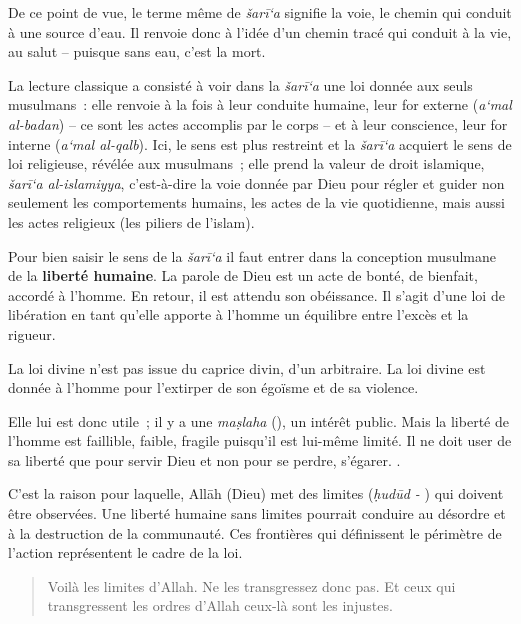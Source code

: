 De ce point de vue, le terme même de \emph{šarī`a} signifie la voie, le
chemin qui conduit à une source d'eau. Il renvoie donc à l'idée d'un
chemin tracé qui conduit à la vie, au salut -- puisque sans eau, c'est
la mort.

La lecture classique a consisté à voir dans la \emph{šarī`a} une loi
donnée aux seuls musulmans~: elle renvoie à la fois à leur conduite
humaine, leur for externe (\emph{a`mal al-badan}) -- ce sont les actes
accomplis par le corps -- et à leur conscience, leur for interne
(\emph{a`mal al-qalb}). Ici, le sens est plus restreint et la
\emph{šarī`a} acquiert le sens de loi religieuse, révélée aux
musulmans~; elle prend la valeur de droit islamique, \emph{šarī`a
al-islamiyya}, c'est-à-dire la voie donnée par Dieu pour régler et
guider non seulement les comportements humains, les actes de la vie
quotidienne, mais aussi les actes religieux (les piliers de l'islam).

Pour bien saisir le sens de la \emph{šarī`a} il faut entrer dans la
conception musulmane de la \textbf{liberté humaine}. La parole de Dieu est un
acte de bonté, de bienfait, accordé à l'homme. En retour, il est attendu
son obéissance. Il s'agit d'une loi de libération en tant qu'elle
apporte à l'homme un équilibre entre l'excès et la rigueur. 
\begin{Def}[Loi]
La loi
divine n'est pas issue du caprice divin, d'un arbitraire. La loi divine
est donnée à l'homme pour l'extirper de son égoïsme et de sa violence.
\end{Def}


Elle lui est donc utile~; il y a une \emph{maṣlaha} (), un
intérêt public. 
Mais la liberté de l'homme est faillible, faible,
fragile puisqu'il est lui-même limité. Il ne doit user de sa liberté que
pour servir Dieu et non pour se perdre, s'égarer.
.

C'est la raison pour laquelle, Allāh (Dieu) met des limites (\emph{ḥudūd
-} ) qui doivent être observées. Une liberté humaine sans
limites pourrait conduire au désordre et à la destruction de la
communauté. Ces frontières qui définissent le périmètre de l'action
représentent le cadre de la loi.



\begin{quote}

Voilà les limites d'Allah. Ne les transgressez donc pas. Et ceux qui
transgressent les ordres d'Allah ceux-là sont les injustes.
\end{quote}

